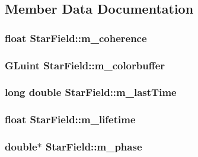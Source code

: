 \subsection{Member Data Documentation}
\hypertarget{classStarField_a65a4e5967dd2e328274d61cf8a5c50ba}{
\subsubsection[{m\-\_\-coherence}]{\setlength{\rightskip}{0pt plus 5cm}float Star\-Field\-::m\-\_\-coherence}}\label{classStarField_a65a4e5967dd2e328274d61cf8a5c50ba}
\hypertarget{classStarField_aa3e4c31177f3c5be4f11e629e4a1b5a6}{
\subsubsection[{m\-\_\-colorbuffer}]{\setlength{\rightskip}{0pt plus 5cm}G\-Luint Star\-Field\-::m\-\_\-colorbuffer}}\label{classStarField_aa3e4c31177f3c5be4f11e629e4a1b5a6}
\hypertarget{classStarField_a04bcafb900567a3b87f9c910614c8fa4}{
\subsubsection[{m\-\_\-last\-Time}]{\setlength{\rightskip}{0pt plus 5cm}long double Star\-Field\-::m\-\_\-last\-Time}}\label{classStarField_a04bcafb900567a3b87f9c910614c8fa4}
\hypertarget{classStarField_a575970efe2365bb4dfa1b1b2eebafbd7}{
\subsubsection[{m\-\_\-lifetime}]{\setlength{\rightskip}{0pt plus 5cm}float Star\-Field\-::m\-\_\-lifetime}}\label{classStarField_a575970efe2365bb4dfa1b1b2eebafbd7}
\hypertarget{classStarField_a922034700e887585b42b80df399ddede}{
\subsubsection[{m\-\_\-phase}]{\setlength{\rightskip}{0pt plus 5cm}double$\ast$ Star\-Field\-::m\-\_\-phase}}\label{classStarField_a922034700e887585b42b80df399ddede}
